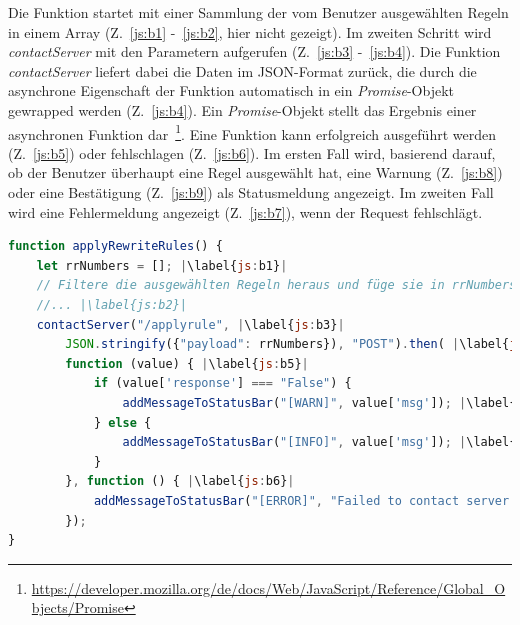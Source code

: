Die Funktion startet mit einer Sammlung der vom Benutzer ausgewählten Regeln in einem Array (Z.~\ref{js:b1} -~\ref{js:b2}, hier nicht gezeigt).
Im zweiten Schritt wird \textit{contactServer} mit den Parametern aufgerufen (Z.~\ref{js:b3} -~\ref{js:b4}).
Die Funktion \textit{contactServer} liefert dabei die Daten im JSON-Format zurück, die durch die asynchrone Eigenschaft der Funktion automatisch in ein \textit{Promise}-Objekt gewrapped werden (Z.~\ref{js:b4}).
Ein \textit{Promise}-Objekt stellt das Ergebnis einer asynchronen Funktion dar~\footnote{\hspace{1.5mm}\url{https://developer.mozilla.org/de/docs/Web/JavaScript/Reference/Global_Objects/Promise}}.
Eine Funktion kann erfolgreich ausgeführt werden (Z.~\ref{js:b5}) oder fehlschlagen (Z.~\ref{js:b6}). Im ersten Fall wird, basierend darauf, ob der Benutzer überhaupt eine Regel ausgewählt hat,
eine Warnung (Z.~\ref{js:b8}) oder eine Bestätigung (Z.~\ref{js:b9}) als Statusmeldung angezeigt.
Im zweiten Fall wird eine Fehlermeldung angezeigt (Z.~\ref{js:b7}), wenn der Request fehlschlägt.

\begin{lstlisting}[language=JavaScript, escapechar=|, caption=Funktion \textit{applyRewriteRules()} aus der Datei \textit{index.js}, label={lst:apply}]
function applyRewriteRules() {
    let rrNumbers = []; |\label{js:b1}|
    // Filtere die ausgewählten Regeln heraus und füge sie in rrNumbers ein
    //... |\label{js:b2}|
    contactServer("/applyrule", |\label{js:b3}|
        JSON.stringify({"payload": rrNumbers}), "POST").then( |\label{js:b4}|
        function (value) { |\label{js:b5}|
            if (value['response'] === "False") {
                addMessageToStatusBar("[WARN]", value['msg']); |\label{js:b8}|
            } else {
                addMessageToStatusBar("[INFO]", value['msg']); |\label{js:b9}|
            }
        }, function () { |\label{js:b6}|
            addMessageToStatusBar("[ERROR]", "Failed to contact server."); |\label{js:b7}|
        }); 
}
\end{lstlisting} 
